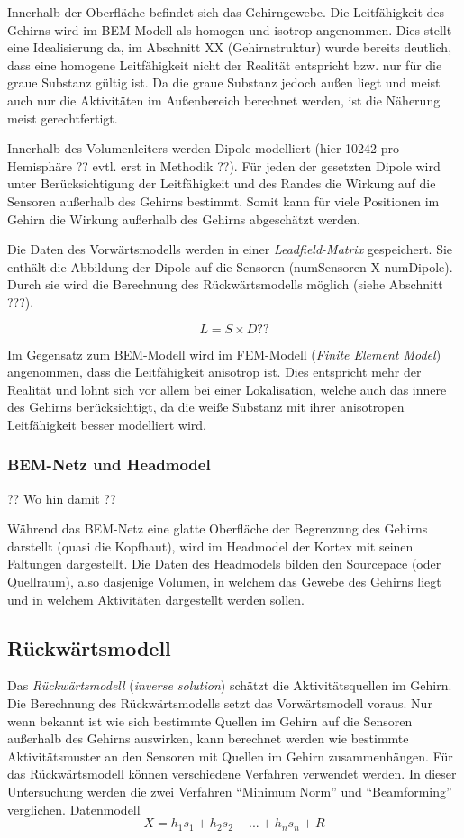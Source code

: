 \documentclass[doc,a4paper,12pt]{apa6}
\begin{document}
Innerhalb der Oberfläche befindet sich das Gehirngewebe. Die Leitfähigkeit des Gehirns wird im BEM-Modell als homogen und isotrop angenommen. Dies stellt eine Idealisierung da, im Abschnitt XX (Gehirnstruktur) wurde bereits deutlich, dass eine homogene Leitfähigkeit nicht der Realität entspricht bzw. nur für die graue Substanz gültig ist. Da die graue Substanz jedoch außen liegt und meist auch nur die Aktivitäten im Außenbereich berechnet werden, ist die Näherung meist gerechtfertigt.

Innerhalb des Volumenleiters werden Dipole modelliert (hier 10242 pro Hemisphäre ?? evtl. erst in Methodik ??). Für jeden der gesetzten Dipole wird unter Berücksichtigung der Leitfähigkeit und des Randes die Wirkung auf die Sensoren außerhalb des Gehirns bestimmt. Somit kann für viele Positionen im Gehirn die Wirkung außerhalb des Gehirns abgeschätzt werden.

Die Daten des Vorwärtsmodells werden in einer \emph{Leadfield-Matrix} gespeichert. Sie enthält die Abbildung der Dipole auf die Sensoren (numSensoren X numDipole). Durch sie wird die Berechnung des Rückwärtsmodells möglich (siehe Abschnitt ???).

\[ L = S \times D ?? \]

Im Gegensatz zum BEM-Modell wird im FEM-Modell (\emph{Finite Element Model}) angenommen, dass die Leitfähigkeit anisotrop ist. Dies entspricht mehr der Realität und lohnt sich vor allem bei einer Lokalisation, welche auch das innere des Gehirns berücksichtigt, da die weiße Substanz mit ihrer anisotropen Leitfähigkeit besser modelliert  wird.

\subsubsection{BEM-Netz und Headmodel}

?? Wo hin damit ??

Während das BEM-Netz eine glatte Oberfläche der Begrenzung des Gehirns darstellt (quasi die Kopfhaut), wird im Headmodel der Kortex mit seinen Faltungen dargestellt. Die Daten des Headmodels bilden den Sourcepace (oder Quellraum), also dasjenige Volumen, in welchem das Gewebe des Gehirns liegt und in welchem Aktivitäten dargestellt werden sollen.

\subsection{Rückwärtsmodell}

Das \emph{Rückwärtsmodell} (\emph{inverse solution}) schätzt die Aktivitätsquellen im Gehirn. Die Berechnung des Rückwärtsmodells setzt das Vorwärtsmodell voraus. Nur wenn bekannt ist wie sich bestimmte Quellen im Gehirn auf die Sensoren außerhalb des Gehirns auswirken, kann berechnet werden wie bestimmte Aktivitätsmuster an den Sensoren mit Quellen im Gehirn zusammenhängen. Für das Rückwärtsmodell können verschiedene Verfahren verwendet werden. In dieser Untersuchung werden die zwei Verfahren “Minimum Norm” und “Beamforming” verglichen.
Datenmodell
\begin{equation}
X = h_1 s_1 + h_2 s_2 + ... + h_n s_n + R
\end{equation}
\end{document}
